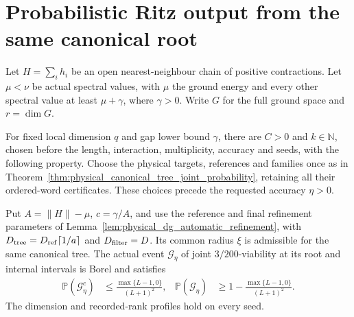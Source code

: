 \section{Probabilistic Ritz output from the same canonical root}

\begin{theorem}
    \label{thm:physical_canonical_ritz_polynomial}
    \leanok
    Let $H=\sum_i h_i$ be an open nearest-neighbour chain of positive
    contractions. Let $\mu<\nu$ be actual spectral values, with
    $\mu$ the ground energy and every other spectral value at least
    $\mu+\gamma$, where $\gamma>0$. Write $G$ for the full ground space
    and $r=\dim G$.

    For fixed local dimension $q$ and gap lower bound $\gamma$, there
    are $C>0$ and $k\in\mathbb N$, chosen before the length, interaction,
    multiplicity, accuracy and seeds, with the following property.
    Choose the physical targets, references and families once as in
    Theorem~\ref{thm:physical_canonical_tree_joint_probability}, retaining
    all their ordered-word certificates. These choices precede the
    requested accuracy $\eta>0$.

    Put $A=\|H\|-\mu$, $c=\gamma/A$, and use the reference and final
    refinement parameters of Lemma~\ref{lem:physical_dg_automatic_refinement},
    with $D_{\rm tree}=D_{\rm ref}\lceil1/a\rceil$ and
    $D_{\rm filter}=D$. Its common radius $\xi$ is admissible for the
    same canonical tree. The actual event $\mathcal G_\eta$ of joint
    $3/200$-viability at its root and internal intervals is Borel and
    satisfies
    \begin{align}
        \mathbb P(\mathcal G_\eta^c)
         & \le\frac{\max\{L-1,0\}}{(L+1)^2},   &
        \mathbb P(\mathcal G_\eta)
         & \ge1-\frac{\max\{L-1,0\}}{(L+1)^2}.
    \end{align}
    The dimension and recorded-rank profiles hold on every seed.


\end{theorem}
